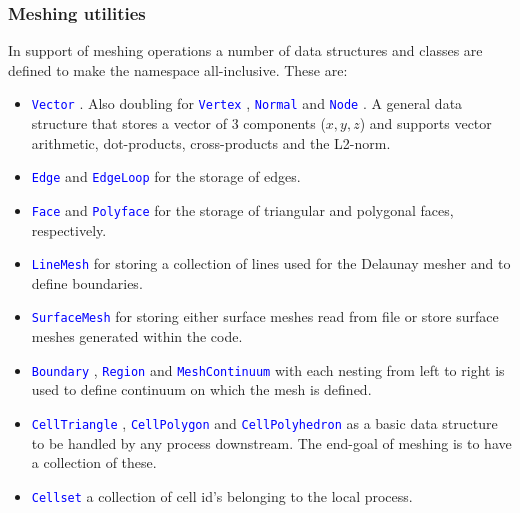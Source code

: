 \documentclass[11pt,letterpaper,titlepage]{article}
\newcommand{\xmltag}[1]{\textcolor{blue}{ \texttt{#1}} }
\numberwithin{equation}{section}
\begin{document}
\subsubsection{Meshing utilities}
In support of meshing operations a number of data structures and classes are defined to make the namespace all-inclusive. These are:
\begin{itemize}[noitemsep]
\item \xmltag{Vector}. Also doubling for \xmltag{Vertex}, \xmltag{Normal} and \xmltag{Node}. A general data structure that stores a vector of 3 components ($x,y,z$) and supports vector arithmetic, dot-products, cross-products and the L2-norm.
\item \xmltag{Edge} and \xmltag{EdgeLoop} for the storage of edges.
\item \xmltag{Face} and \xmltag{Polyface} for the storage of triangular and polygonal faces, respectively.
\item \xmltag{LineMesh} for storing a collection of lines used for the Delaunay mesher and to define boundaries.
\item \xmltag{SurfaceMesh} for storing either surface meshes read from file or store surface meshes generated within the code.
\item \xmltag{Boundary}, \xmltag{Region} and \xmltag{MeshContinuum} with each nesting from left to right is used to define continuum on which the mesh is defined.
\item \xmltag{CellTriangle}, \xmltag{CellPolygon} and \xmltag{CellPolyhedron} as a basic data structure to be handled by any process downstream. The end-goal of meshing is to have a collection of these.
\item \xmltag{Cellset} a collection of cell id's belonging to the local process.
\end{itemize}



\newpage 
\end{document}
